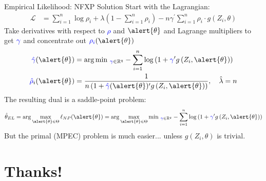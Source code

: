 \documentclass[aspectratio=169,11pt]{beamer}
\begin{document}
\begin{frame}{Empirical Likelihood: NFXP Solution}
Start with the Lagrangian:
\begin{align*}
\mathcal{L} &=\sum_{i=1}^{n} \log \rho_{i}+\lambda\left(1-\sum_{i=1}^{n} \rho_{i}\right)-n \gamma^{\prime} \sum_{i=1}^{n} \rho_{i}\cdot g\left(Z_{i}, \theta\right)
\end{align*}
Take derivatives with respect to \textcolor{blue}{$\rho$} and $\alert{\theta}$ and Lagrange multipliers to get $\textcolor{blue}{\gamma}$ and concentrate out $\textcolor{blue}{\rho_i}(\alert{\theta})$
\begin{align*}
\textcolor{blue}{\hat{\gamma}}(\alert{\theta}) &=\arg \min\, _{\textcolor{blue}{\gamma} \in \mathbb{R}^{q}}-
\sum_{i=1}^{n} \log \left(1+\textcolor{blue}{\gamma}^{\prime} g\left(Z_{i}, \alert{\theta}\right)\right) \\
\textcolor{blue}{\hat{\rho}}_{i}(\alert{\theta}) &=\frac{1}{n\left(1+\textcolor{blue}{\hat{\gamma}}(\alert{\theta})^{\prime} g\left(Z_{i}, \alert{\theta}\right)\right)}, \quad \hat{\lambda}=n
\end{align*}
The resulting dual is a saddle-point problem:
\begin{align*}
\hat{\theta}_{E L}=\arg \max _{\alert{\theta} \in \Theta} \ell_{N P}(\alert{\theta})=\arg \max _{\alert{\theta} \in \Theta} \min\, _{\textcolor{blue}{\gamma} \in \mathbb{R}^{q}}-\sum_{i=1}^{n} \log \left(1+\textcolor{blue}{\gamma}^{\prime} g\left(Z_{i}, \alert{\theta}\right)\right)
\end{align*}
But the primal (MPEC) problem is much easier... unless $g(Z_i,\theta)$ is trivial.
\end{frame}

\section{Thanks!}
\end{document}
